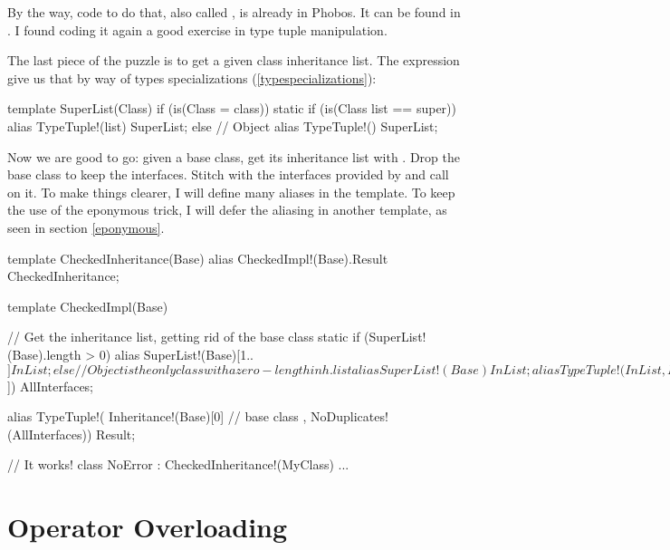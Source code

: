 By the way, code to do that, also called , is already in Phobos. It can be found in . I found coding it again a good exercise in type tuple manipulation.

The last piece of the puzzle is to get a given class inheritance list. The  expression give us that by way of types specializations (\ref{typespecializations}):

\begin{dcode}
template SuperList(Class) if (is(Class = class))
{
    static if (is(Class list == super))
        alias TypeTuple!(list) SuperList;
    else // Object
        alias TypeTuple!() SuperList;
}
\end{dcode}

Now we are good to go: given a base class, get its inheritance list with . Drop the base class to keep the interfaces. Stitch with the interfaces provided by  and call  on it. To make things clearer, I will define many aliases in the template. To keep the use of the eponymous trick, I will defer the aliasing in another template, as seen in section \ref{eponymous}.

\begin{dcode}
template CheckedInheritance(Base)
{
    alias CheckedImpl!(Base).Result CheckedInheritance;
}

template CheckedImpl(Base)
{
    // Get the inheritance list, getting rid of the base class
    static if (SuperList!(Base).length > 0)
        alias SuperList!(Base)[1..$] InList;
    else // Object is the only class with a zero-length inh. list
        alias SuperList!(Base)       InList;

    alias TypeTuple!( InList
                    , Inheritance!(Base)[1..$]) AllInterfaces;

    alias TypeTuple!( Inheritance!(Base)[0] // base class
                    , NoDuplicates!(AllInterfaces)) Result;
} 

// It works!
class NoError : CheckedInheritance!(MyClass) { ... }
\end{dcode}


\section{Operator Overloading} \label{operatoroverloading}

